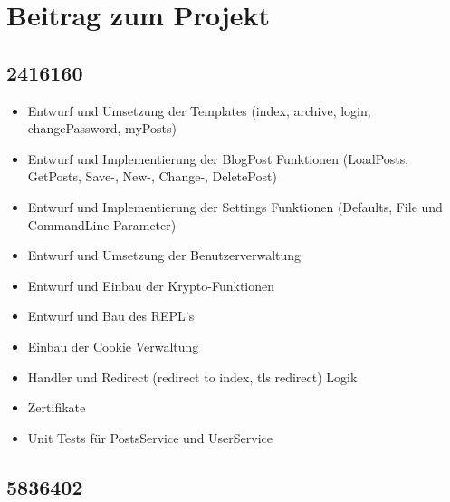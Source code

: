 \documentclass[10pt]{article}
\begin{document}
	\section{Beitrag zum Projekt}
		\subsection{2416160}
		\begin{itemize}
			\item Entwurf und Umsetzung der Templates (index, archive, login, changePassword, myPosts)
			\item Entwurf und Implementierung der BlogPost Funktionen (LoadPosts, GetPosts, Save-, New-, Change-, DeletePost)
			\item Entwurf und Implementierung der Settings Funktionen (Defaults, File und CommandLine Parameter)
			\item Entwurf und Umsetzung der Benutzerverwaltung
			\item Entwurf und Einbau der Krypto-Funktionen
			\item Entwurf und Bau des REPL's
			\item Einbau der Cookie Verwaltung
			\item Handler und Redirect (redirect to index, tls redirect) Logik
			\item Zertifikate
			\item Unit Tests f\"ur PostsService und UserService
		\end{itemize}		
		\subsection{5836402}
\end{document}
